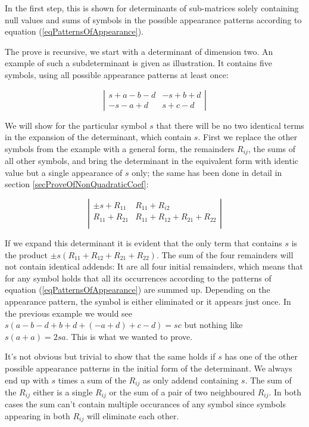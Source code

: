 \noindent
In the first step, this is shown for determinants of sub-matrices solely
containing null values and sums of symbols in the possible appearance
patterns according to equation (\ref{eqPatternsOfAppearance}).

The prove is recursive, we start with a determinant of dimension two. An
example of such a subdeterminant is given as illustration. It contains
five symbols, using all possible appearance patterns at least once:

\begin{displaymath}
\left|
\begin{array}{cc}
s+a-b-d   &   -s+b+d  \\
-s-a+d    &   s+c-d
\end{array}
\right|
\end{displaymath}

We will show for the particular symbol $s$ that there will be no two
identical terms in the expansion of the determinant, which contain $s$.
First we replace the other symbols from the example with a general form,
the remainders $R_{ij}$, the sums of all other symbols, and bring the
determinant in the equivalent form with identic value but a single
appearance of $s$ only; the same has been done in detail in section
\ref{secProveOfNonQuadraticCoef}:

\begin{displaymath}
\left|
\begin{array}{cc}
\pm s + R_{11}  & R_{11} + R_{i2}                   \\
R_{11} + R_{21} & R_{11} + R_{12} + R_{21} + R_{22} \\
\end{array}
\right|
\end{displaymath}

If we expand this determinant it is evident that the only term that
contains $s$ is the product $\pm s(R_{11} + R_{12} + R_{21} + R_{22})$.
The sum of the four remainders will not contain identical addends: It are
all four initial remainders, which means that for any symbol holds that
all its occurrences according to the patterns of equation
(\ref{eqPatternsOfAppearance}) are summed up. Depending on the appearance
pattern, the symbol is either eliminated or it appears just once. In the
previous example we would see $s(a-b-d + b+d + (-a+d) + c-d) = sc$ but
nothing like $s(a+a) = 2sa$. This is what we wanted to prove.

It's not obvious but trivial to show that the same holds if $s$ has one of
the other possible appearance patterns in the initial form of the
determinant. We always end up with $s$ times a sum of the $R_{ij}$ as only
addend containing $s$. The sum of the $R_{ij}$ either is a single $R_{ij}$
or the sum of a pair of two neighboured $R_{ij}$. In both cases the sum
can't contain multiple occurances of any symbol since symbols appearing in
both $R_{ij}$ will eliminate each other.

